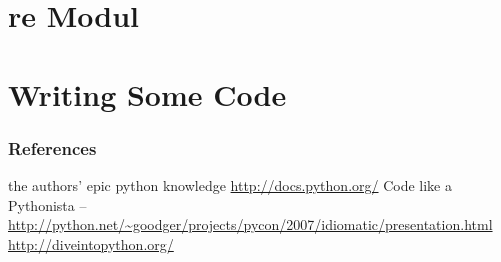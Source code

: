 \documentclass{beamer}
\begin{document}


\section{re Modul}

\section{Writing Some Code}





\begin{frame}
	\frametitle{References}
	\begin{thebibliography}{3}
	 the authors' epic python knowledge
	 \url{http://docs.python.org/}
	 Code like a Pythonista -- \url{http://python.net/~goodger/projects/pycon/2007/idiomatic/presentation.html}
	 \url{http://diveintopython.org/}
	\end{thebibliography}
\end{frame}
\end{document}
